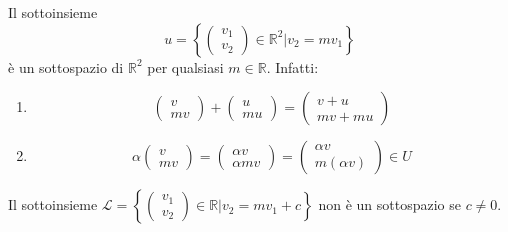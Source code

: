 \documentclass[a4paper]{article}
\theoremstyle{break}
\theoremstyle{break}
\theoremstyle{break}
\theoremstyle{break}
\begin{document}
  \begin{example}
    Il sottoinsieme
    \[
    u = \left\{ \begin{pmatrix} v_1\\v_2 \end{pmatrix} \in \mathbb{R}^2 \Big | v_2 = mv_1 \right\} 
    \] 
    è un sottospazio di \( \mathbb{R}^2 \) per qualsiasi \( m \in \mathbb{R} \).
    Infatti:
    \begin{enumerate}
      \item \[
      \begin{pmatrix} v\\mv \end{pmatrix}
      +
      \begin{pmatrix} u\\mu \end{pmatrix} =
      \begin{pmatrix} v+u\\mv+mu \end{pmatrix}
      \] 
      \item
        \[
        \alpha \begin{pmatrix} v\\mv \end{pmatrix} =
        \begin{pmatrix} \alpha v\\\alpha mv \end{pmatrix} =
        \begin{pmatrix} \alpha v\\m(\alpha v) \end{pmatrix} \in U
        \] 
      \begin{center}
      \end{center}
    \end{enumerate}
    Il sottoinsieme \( \mathcal{L} = \left\{ \begin{pmatrix} v_1\\v_2 \end{pmatrix} \in \mathbb{R} \Big | v_2 = mv_1 + c \right\}  \) non
    è un sottospazio se \( c \neq 0 \).
    \begin{center}
\end{center}
\end{example}
\end{document}
